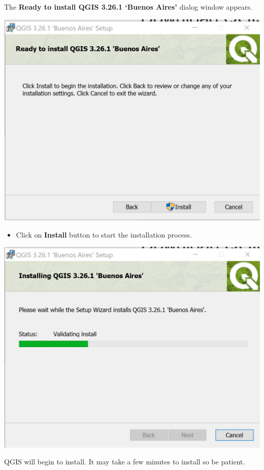 \documentclass[
  letterpaper,
  DIV=11,
  numbers=noendperiod]{scrreprt}
\providecommand{\tightlist}{%
  \setlength{\itemsep}{0pt}\setlength{\parskip}{0pt}}\usepackage{longtable,booktabs,array}
\begin{document}
The \textbf{Ready to install QGIS 3.26.1 `Buenos Aires'} dialog window
appears.

\includegraphics{./img/image8.jpg}

\begin{itemize}
\tightlist
\item
  Click on \textbf{Install} button to start the installation process.
\end{itemize}

\includegraphics{./img/image9.jpg}

QGIS will begin to install. It may take a few minutes to install so be
patient.
\end{document}
